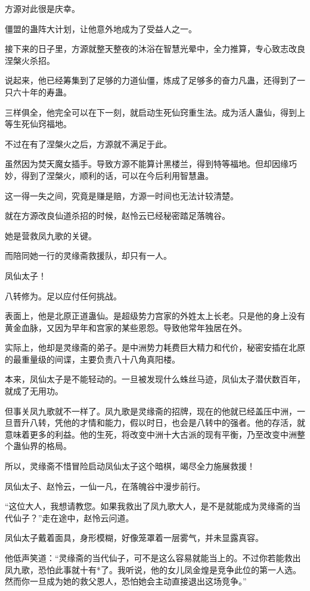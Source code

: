 \begin{this_body}
方源对此很是庆幸。

僵盟的蛊阵大计划，让他意外地成为了受益人之一。

接下来的日子里，方源就整天整夜的沐浴在智慧光晕中，全力推算，专心致志改良涅槃火杀招。

说起来，他已经筹集到了足够的力道仙僵，炼成了足够多的奋力凡蛊，还得到了一只六十年的寿蛊。

三样俱全，他完全可以在下一刻，就启动生死仙窍重生法。成为活人蛊仙，得到上等生死仙窍福地。

不过在有了涅槃火之后，方源就不满足于此。

虽然因为焚天魔女插手。导致方源不能算计黑楼兰，得到特等福地。但却因缘巧妙，得到了涅槃火，顺利的话，可以在今后利用智慧蛊。

这一得一失之间，究竟是赚是赔，方源一时间也无法计较清楚。

就在方源改良仙道杀招的时候，赵怜云已经秘密踏足落魄谷。

她是营救凤九歌的关键。

而陪同她一行的灵缘斋救援队，却只有一人。

凤仙太子！

八转修为。足以应付任何挑战。

表面上，他是北原正道蛊仙。是超级势力宫家的外姓太上长老。只是他的身上没有黄金血脉，又因为早年和宫家的某些恩怨。导致他常年独居在外。

实际上，他却是灵缘斋的弟子。是中洲势力耗费巨大精力和代价，秘密安插在北原的最重量级的间谍，主要负责八十八角真阳楼。

本来，凤仙太子是不能轻动的。一旦被发现什么蛛丝马迹，凤仙太子潜伏数百年，就成了无用功。

但事关凤九歌就不一样了。凤九歌是灵缘斋的招牌，现在的他就已经盖压中洲，一旦晋升八转，凭他的才情和能力，假以时日，也会是八转中的强者。他的存活，就意味着更多的利益。他的生死，将改变中洲十大古派的现有平衡，乃至改变中洲整个蛊仙界的格局。

所以，灵缘斋不惜冒险启动凤仙太子这个暗棋，竭尽全力施展救援！

凤仙太子、赵怜云，一仙一凡，在落魄谷中漫步前行。

“这位大人，我想请教您。如果我救出了凤九歌大人，是不是就能成为灵缘斋的当代仙子？”走在途中，赵怜云问道。

凤仙太子戴着面具，身形模糊，好像笼罩着一层雾气，并未显露真容。

他低声笑道：“灵缘斋的当代仙子，可不是这么容易就能当上的。不过你若能救出凤九歌，恐怕此事就十有*了。我听说，他的女儿凤金煌是竞争此位的第一人选。然而你一旦成为她的救父恩人，恐怕她会主动直接退出这场竞争。”


\end{this_body}
